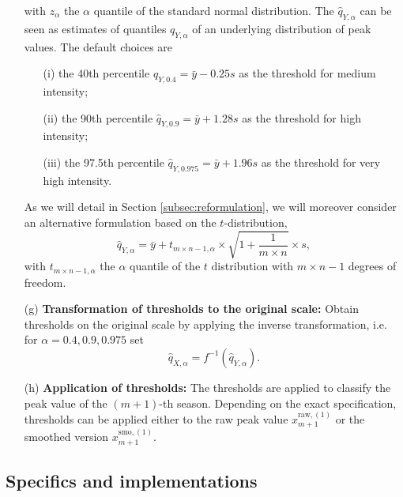 \documentclass[12pt]{article}
\newcommand{\sd}{s}
\begin{document}
\begin{enumerate}
\begin{equation}
\end{equation}
with $z_\alpha$ the $\alpha$ quantile of the standard normal distribution. The $\hat{q}_{Y, \alpha}$ can be seen as estimates of quantiles $q_{Y, \alpha}$ of an underlying distribution of peak values. The default choices are
\begin{itemize}
\item[(i)] the 40th percentile $\hat{q}_{Y, 0.4} = \bar{y} - 0.25 \sd$ as the threshold for medium intensity;
\item[(ii)] the 90th percentile $\hat{q}_{Y, 0.9} = \bar{y} + 1.28 \sd$ as the threshold for high intensity;
\item[(iii)] the 97.5th percentile $\hat{q}_{Y, 0.975} = \bar{y} + 1.96\sd$ as the threshold for very high intensity.
\end{itemize}
As we will detail in Section \ref{subsec:reformulation}, we will moreover consider an alternative formulation based on the $t$-distribution,
\begin{equation}
\hat{q}_{Y, \alpha} = \bar{y} + t_{m\times n - 1, \alpha} \times \sqrt{1 + \frac{1}{m\times n}} \times s,
\label{eq:q_Y_t}
\end{equation}
with $t_{m\times n - 1, \alpha}$ the $\alpha$ quantile of the $t$ distribution with $m\times n - 1$ degrees of freedom.
\item[(g)] \textbf{Transformation of thresholds to the original scale:} Obtain thresholds on the original scale by applying the inverse transformation, i.e. for $\alpha = 0.4, 0.9, 0.975$ set%
$$
\hat{q}_{X, \alpha} = f^{-1}(\hat{q}_{Y, \alpha}).
$$
\item[(h)] \textbf{Application of thresholds:} The thresholds are applied to classify the peak value of the $(m + 1)$-th season. Depending on the exact specification, thresholds can be applied either to the raw peak value $x_{m + 1}^{\text{raw}, (1)}$ or the smoothed version $x_{m + 1}^{\text{smo}, (1)}$.
\end{enumerate}

\subsection{Specifics and implementations}
\end{document}
